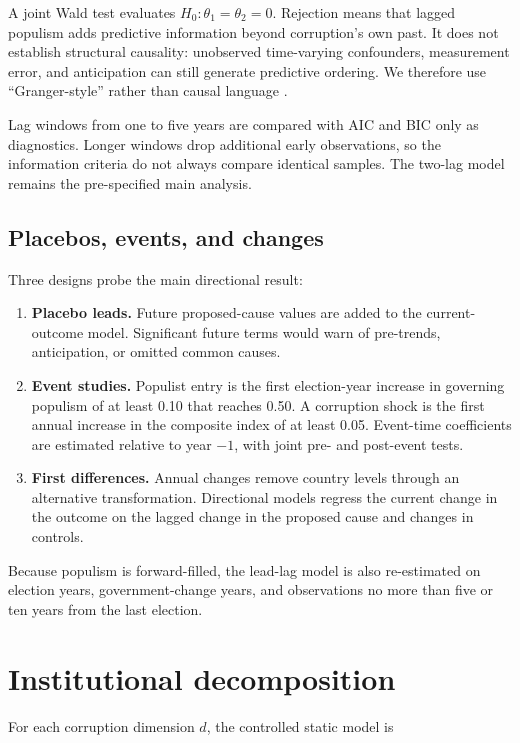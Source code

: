 A joint Wald test evaluates $H_0:\theta_1=\theta_2=0$. Rejection means that lagged populism adds
predictive information beyond corruption's own past. It does not establish structural causality:
unobserved time-varying confounders, measurement error, and anticipation can still generate predictive
ordering. We therefore use ``Granger-style'' rather than causal language
\citep{granger1969}.

Lag windows from one to five years are compared with AIC and BIC only as diagnostics. Longer windows
drop additional early observations, so the information criteria do not always compare identical
samples. The two-lag model remains the pre-specified main analysis.

\subsection{Placebos, events, and changes}

Three designs probe the main directional result:

\begin{enumerate}
  \item \textbf{Placebo leads.} Future proposed-cause values are added to the current-outcome model.
  Significant future terms would warn of pre-trends, anticipation, or omitted common causes.
  \item \textbf{Event studies.} Populist entry is the first election-year increase in governing
  populism of at least 0.10 that reaches 0.50. A corruption shock is the first annual increase in the
  composite index of at least 0.05. Event-time coefficients are estimated relative to year $-1$, with
  joint pre- and post-event tests.
  \item \textbf{First differences.} Annual changes remove country levels through an alternative
  transformation. Directional models regress the current change in the outcome on the lagged change in
  the proposed cause and changes in controls.
\end{enumerate}

Because populism is forward-filled, the lead-lag model is also re-estimated on election years,
government-change years, and observations no more than five or ten years from the last election.

\section{Institutional decomposition}

For each corruption dimension $d$, the controlled static model is

